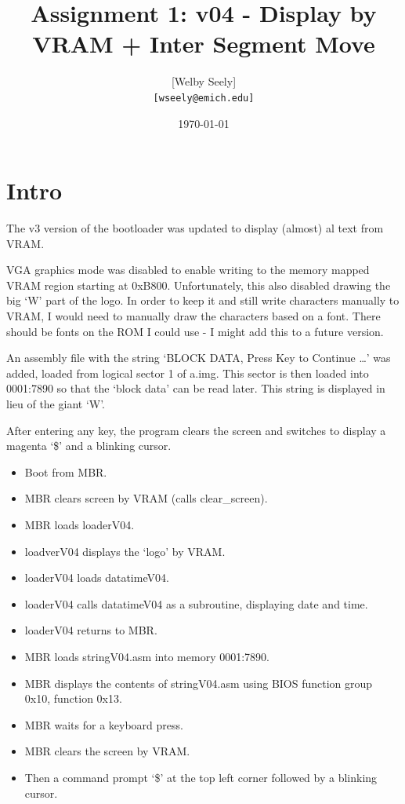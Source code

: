 \documentclass{article}
\title{Assignment 1: v04 - Display by VRAM + Inter Segment Move}
\author{
    [Welby Seely] \\
    \texttt{[wseely@emich.edu]}
}
\date{\today}
\begin{document}
    \maketitle
    \section{Intro}\label{sec:intro}
    The v3 version of the bootloader was updated to display (almost) al text from VRAM.

    VGA graphics mode was disabled to enable writing to the memory mapped VRAM region starting at 0xB800.
    Unfortunately, this also disabled drawing the big `W' part of the logo.
    In order to keep it and still write characters manually to VRAM, I would need to manually draw the characters based on a font.
    There should be fonts on the ROM I could use - I might add this to a future version.

    An assembly file with the string `BLOCK DATA, Press Key to Continue \ldots' was added, loaded from logical sector 1 of a.img.
    This sector is then loaded into 0001:7890 so that the `block data' can be read later.
    This string is displayed in lieu of the giant `W'.

    After entering any key, the program clears the screen and switches to display a magenta `\$' and a
    blinking cursor.

    \begin{itemize}
        \item Boot from MBR.
        \item MBR clears screen by VRAM (calls clear\_screen).
        \item MBR loads loaderV04.
        \item loadverV04 displays the `logo' by VRAM.
        \item loaderV04 loads datatimeV04.
        \item loaderV04 calls datatimeV04 as a subroutine, displaying date and time.
        \item loaderV04 returns to MBR.
        \item MBR loads stringV04.asm into memory 0001:7890.
        \item MBR displays the contents of stringV04.asm using BIOS function group 0x10, function 0x13.
        \item MBR waits for a keyboard press.
        \item MBR clears the screen by VRAM.
        \item Then a command prompt `\$' at the top left corner followed by a blinking cursor.
    \end{itemize}
\end{document}
